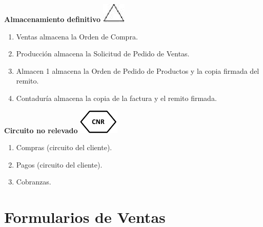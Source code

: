 \begin{center}
  \textbf{Almacenamiento definitivo}
  \includegraphics{./Images/Simbolos/simbolo-Almacenamiento-Definitivo.png}
\end{center}
\begin{enumerate}
  \item Ventas almacena la Orden de Compra.
  \item Producción almacena la Solicitud de Pedido de Ventas.
  \item Almacen 1 almacena la Orden de Pedido de Productos y la copia firmada del remito.
  \item Contaduría almacena la copia de la factura y el remito firmada.  
\end{enumerate}

\begin{center}
  \textbf{Circuito no relevado}
  \includegraphics{./Images/Simbolos/simbolo-CNR.png}
\end{center}
\begin{enumerate}
  \item Compras (circuito del cliente).
  \item Pagos (circuito del cliente).
  \item Cobranzas.
\end{enumerate}



\pagebreak
\section{Formularios de Ventas}

